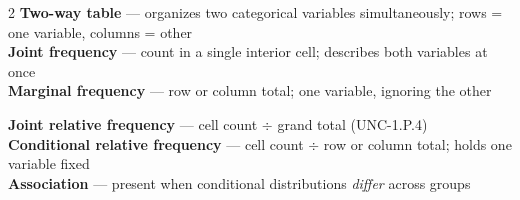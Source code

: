 \documentclass[aspectratio=169, 11pt]{beamer}
\begin{document}
{
\begin{frame}[t, plain]
  \vspace{1.05cm}\par
  \hspace{0.4cm}%
  \begin{minipage}{0.93\textwidth}
    \vspace{1em}
    \footnotesize
    \begin{multicols}{2}
      \textbf{\color{greenacc}Two-way table} --- organizes two categorical variables simultaneously; rows = one variable, columns = other\\[4pt]
      \textbf{\color{greenacc}Joint frequency} --- count in a single interior cell; describes both variables at once\\[4pt]
      \textbf{\color{greenacc}Marginal frequency} --- row or column total; one variable, ignoring the other\\[4pt]

      \columnbreak

      \textbf{\color{greenacc}Joint relative frequency} --- cell count $\div$ grand total (UNC-1.P.4)\\[4pt]
      \textbf{\color{greenacc}Conditional relative frequency} --- cell count $\div$ row or column total; holds one variable fixed\\[4pt]
      \textbf{\color{greenacc}Association} --- present when conditional distributions \emph{differ} across groups
    \end{multicols}
  \end{minipage}
\end{frame}
}
\end{document}
